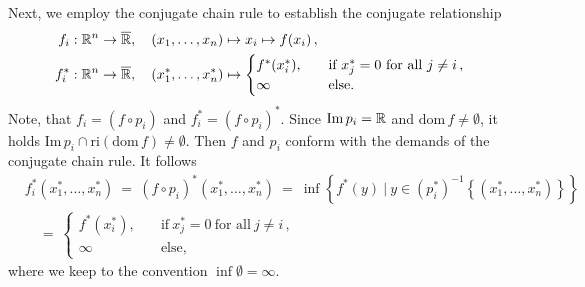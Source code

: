 \begin{example*}
  Next, we employ the conjugate chain rule to establish the conjugate relationship 
  \begin{align*}
    f_i&:\R^n\to \overline{\R}
    ,
    \quad
    (x_1,\ldots,x_n)
    \mapsto x_i \mapsto f(x_i)
    \,,
    \\
    f^*_i&:\R^n\to \overline{\R}
    ,
    \quad
    (x^*_1,\ldots,x^*_n)\mapsto 
    \begin{cases}
      f^*(x_i^*),
      \quad
      &\text{if}\ 
      x_j^*=0\ \text{for all}\ j\neq i\,,
      \\
      \infty
      \quad
      &\text{else.}
    \end{cases}
  \end{align*}
  Note, that 
  $
    f_i
    =
    (f\circ p_i)
  $
  and
  $
    f^*_i
    =
    (f\circ p_i)^*
  $.
  Since 
  $
    \mathrm{Im}\,p_i=\mathbb{R}
  $
  and 
  $
    \mathrm{dom}\, f
    \neq
    \emptyset
  $,
  it holds
  $
    \mathrm{Im}\, p_i
    \cap
    \mathrm{ri}(
    \mathrm{dom}\, f
    )
    \neq
    \emptyset
  $.
  Then $f$ and $p_i$ conform with the demands of the conjugate chain rule.
  It follows
  \begin{align*}
    &f_i^*
    (x^*_1,\ldots,x^*_n) 
    \ 
    =
    \ 
    (f\circ p_i)^*
    (x^*_1,\ldots,x^*_n) 
    \ =
    \ 
    \inf
    \left\{ 
    f^*(y)
    \ 
    |
    \ 
    y\in 
    (p_i^*)^{-1}
    \left\{ 
    (x_1^*,\ldots,x_n^*)
    \right\}
    \right\}
    \\
    &\quad=
    \ 
    \begin{cases}
      f^*(x_i^*),
      \quad
      &\text{if}\ 
      x_j^*=0\ \text{for all}\ j\neq i\,,
      \\
      \infty
      \quad
      &\text{else,}
    \end{cases}
  \end{align*}
  where we keep to the convention $\inf\emptyset=\infty$.


\end{example*}
